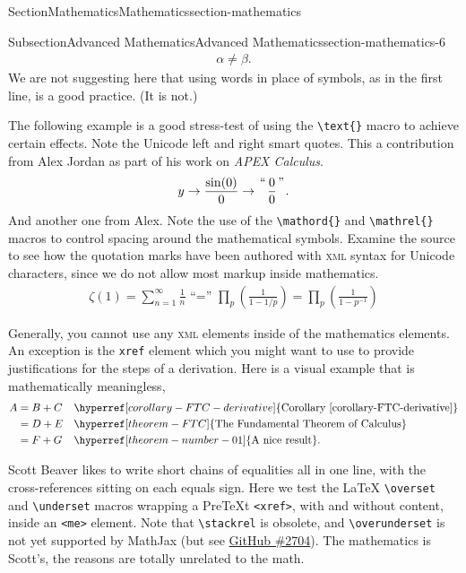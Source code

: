 \documentclass[twoside,10pt,]{article}
\newcommand{\xreffont}{\relax}
\newcommand{\mono}[1]{\texttt{#1}}
\newcommand{\initialism}[1]{\textsc{\MakeLowercase{#1}}}
\newcommand{\pubtitle}[1]{\textsl{#1}}
\numberwithin{equation}{section}
\begin{document}
\begin{sectionptx}{Section}{Mathematics}{}{Mathematics}{}{}{section-mathematics}
\begin{subsectionptx}{Subsection}{Advanced Mathematics}{}{Advanced Mathematics}{}{}{section-mathematics-6}
\begin{gather*}
\alpha\neq\beta\text{.}
\end{gather*}
We are not suggesting here that using words in place of symbols, as in the first line, is a good practice.  (It is not.)%
\par
The following example is a good stress-test of using the \mono{\textbackslash{}text\{\}} macro to achieve certain effects.  Note the Unicode left and right smart quotes.  This a contribution from Alex Jordan as part of his work on \pubtitle{APEX Calculus}.%
\begin{gather*}
y \rightarrow \frac{\sin(0) }{0} \rightarrow {{\text{“}}\atop{}}\frac{0}{0}{{\text{”}}\atop{}}\text{.}
\end{gather*}
And another one from Alex.  Note the use of the \mono{\textbackslash{}mathord\{\}} and \mono{\textbackslash{}mathrel\{\}} macros to control spacing around the mathematical symbols.  Examine the source to see how the quotation marks have been authored with \initialism{XML} syntax for Unicode characters, since we do not allow most markup inside mathematics.%
\begin{gather*}
\zeta(1)=\sum_{n=1}^{\infty}\frac{1}{n}\mathrel{\text{ “}\mathord{=}{\text{” }}}\prod_{p}\left(\frac{1}{1-1/p}\right)=\prod_{p}\left(\frac{1}{1-p^{-1}}\right)
\end{gather*}
%
\par
Generally, you cannot use any \initialism{XML} elements inside of the mathematics elements.  An exception is the \mono{xref} element which you might want to use to provide justifications for the steps of a derivation.  Here is a visual example that is mathematically meaningless,%
\begin{align*}
A&=B+C&&\hyperref[corollary-FTC-derivative]{\text{Corollary {\xreffont\ref{corollary-FTC-derivative}}}}\\
&=D+E&&\hyperref[theorem-FTC]{\text{The Fundamental Theorem of Calculus}}\\
&=F+G&&\hyperref[theorem-number-01]{\text{A nice result}}\text{.}
\end{align*}
%
\par
Scott Beaver likes to write short chains of equalities all in one line, with the cross-references sitting on each equals sign.  Here we test the \LaTeX{} \mono{\textbackslash{}overset} and \mono{\textbackslash{}underset} macros wrapping a PreTeXt \mono{<xref>}, with and without content, inside an \mono{<me>} element.  Note that  \mono{\textbackslash{}stackrel} is obsolete, and \mono{\textbackslash{}overunderset} is not yet supported by MathJax (but see \href{https://github.com/mathjax/MathJax/issues/2704}{GitHub \#2704}).  The mathematics is Scott's, the reasons are totally unrelated to the math.%

\end{subsectionptx}
\end{sectionptx}
\end{document}
